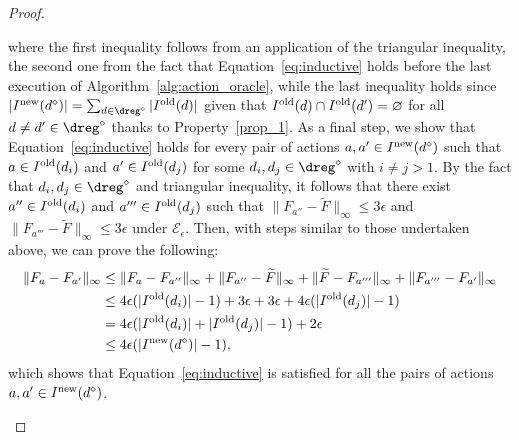 \begin{proof}
\begin{enumerate}
\begin{enumerate}
			where the first inequality follows from an application of the triangular inequality, the second one from the fact that Equation~\eqref{eq:inductive} holds before the last execution of Algorithm~\ref{alg:action_oracle}, while the last inequality holds since $| I^{\textnormal{new}}(d^\diamond) |= \sum_{d \in \dreg^\diamond}| I^{\textnormal{old}}(d) |$ given that $I^\textnormal{old}(d) \cap I^\textnormal{old}(d') = \varnothing$ for all $d \neq d' \in \dreg^\diamond$ thanks to Property~\ref{prop_1}. 
			As a final step, we show that Equation~\eqref{eq:inductive} holds for every pair of actions $a, a' \in I^\textnormal{new}(d^\diamond)$ such that $a \in I^{\textnormal{old}}(d_i)$ and $a' \in I^{\textnormal{old}}(d_j)$ for some $d_i, d_j \in \dreg^\diamond$ with $i \neq j > 1$.
			By the fact that $d_i, d_j \in \dreg^\diamond$ and triangular inequality, it follows that there exist $a'' \in I^{\textnormal{old}}(d_i)$ and $a''' \in I^{\textnormal{old}}(d_j)$ such that $\|F_{a''} -\widetilde F \|_{\infty} \le 3 \epsilon$ and $\| F_{a'''} - \widetilde F \|_{\infty} \le 3 \epsilon$ under $\mathcal{E}_\epsilon$.
			Then, with steps similar to those undertaken above, we can prove the following:
			\begin{align*}
				\| F_{a}- F_{a'}\|_{\infty} & \le\| F_{a}- F_{a''}  \|_{\infty} +\| F_{a''} -\widetilde F \|_{\infty} + \| \widetilde F - F_{a'''}  \|_{\infty}  + \|  F_{a'''} - F_{a'}  \|_{\infty}\\
				&   \le 4 \epsilon(|I^{\textnormal{old}}({d_i}) | -1 ) + 3\epsilon +  3 \epsilon + 4 \epsilon(|I^{\textnormal{old}}({d_j}) | -1 )\\
				&   = 4 \epsilon(| I^{\textnormal{old}}({d_i})| +  |I^{\textnormal{old}}({d_j}) | -1 ) +2\epsilon  \\
				&\le 4 \epsilon(|I^{\textnormal{new}}({d^\diamond})| -1 ),
			\end{align*}
			which shows that Equation~\ref{eq:inductive} is satisfied for all the pairs of actions $a,a' \in I^\textnormal{new}(d^\diamond)$.
			

\end{enumerate}
\end{enumerate}
\end{proof}
